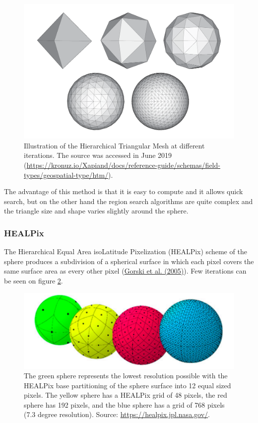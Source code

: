 \documentclass[12pt]{article}
\theoremstyle{plain}
\begin{document}
\begin{figure}[h!]
    \centering
	\includegraphics[width=.9\linewidth]{media/htm.png}
	\caption{Illustration of the Hierarchical Triangular Mesh at different iterations. The source was accessed in June 2019 (\url{https://kronuz.io/Xapiand/docs/reference-guide/schemas/field-types/geospatial-type/htm/}).}
	\label{htm}
\end{figure}

The advantage of this method is that it is easy to compute and it allows quick search, but on the other hand the region search algorithms are quite complex and the triangle size and shape varies slightly around the sphere.

\pagebreak
\subsubsection{HEALPix}

The Hierarchical Equal Area isoLatitude Pixelization (HEALPix) scheme of the sphere produces a subdivision of a spherical surface in which each pixel covers the same surface area as every other pixel (\hyperlink{Gorski et al. (2005)}{Gorski et al. (2005)}). Few iterations can be seen on figure \ref{HEALPix_spheres}.

\begin{figure}[h!]
    \centering
	\includegraphics[width=.65\linewidth]{media/HEALPix_spheres.png}
	\caption{The green sphere represents the lowest resolution possible with the HEALPix base partitioning of the sphere surface into 12 equal sized pixels. The yellow sphere has a HEALPix grid of 48 pixels, the red sphere has 192 pixels, and the blue sphere has a grid of 768 pixels (7.3 degree resolution). Source: \url{https://healpix.jpl.nasa.gov/}.}
	\label{HEALPix_spheres}
\end{figure}
\end{document}
